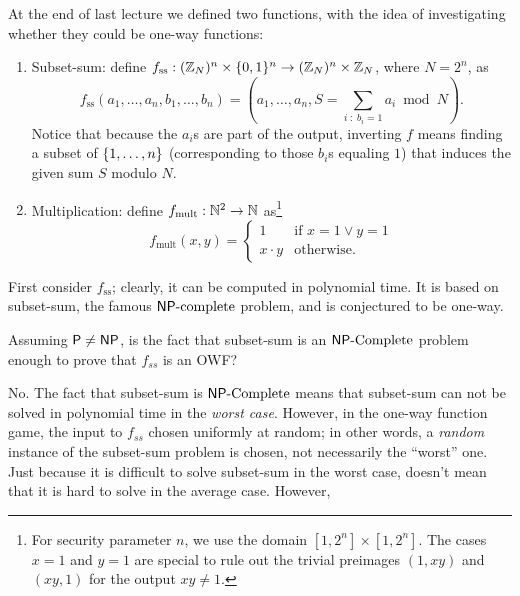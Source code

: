 \documentclass[11pt]{article}
\begin{document}
At the end of last lecture we defined two functions, with the idea of
investigating whether they could be one-way functions:
\begin{enumerate}
\item Subset-sum: define $f_{\text{ss}} : (\mathbb{Z}_{N})^{n} \times \{0,1\}^{n}
  \to (\mathbb{Z}_{N})^{n} \times \mathbb{Z}_{N}$, where $N = 2^{n}$, as \[
  f_{\text{ss}}(a_{1}, \ldots, a_{n}, b_{1}, \ldots, b_{n}) = (a_{1},
  \ldots, a_{n}, S = \sum_{i\; :\; b_{i} = 1} a_{i} \bmod N). \]
  Notice that because the $a_{i}$s are part of the output, inverting
  $f$ means finding a subset of $\{1,\ldots,n\}$ (corresponding to
  those $b_{i}$s equaling $1$) that induces the given sum $S$ modulo
  $N$.
\item Multiplication: define $f_{\text{mult}} : \mathbb{N}^{2} \to \mathbb{N}$
  as\footnote{For security parameter $n$, we use the domain $[1,2^{n}]
    \times [1,2^{n}]$.  The cases $x=1$ and $y=1$ are special to rule
    out the trivial preimages $(1,xy)$ and $(xy, 1)$ for the output
    $xy \neq 1$.}
  \[
  f_{\text{mult}}(x,y) =
  \begin{cases}
    1 & \text{if } x=1 \vee y=1 \\
    x \cdot y & \text{otherwise.}
  \end{cases}
  \]
\end{enumerate}

First consider $f_{\text{ss}}$; clearly, it can be computed in polynomial time. It is
based on subset-sum, the famous $\mathsf{NP}\text{-complete}$ problem, and is conjectured to be
one-way.

\begin{question}
    Assuming \(\mathsf{P} \neq \mathsf{NP}\), is the fact that subset-sum is an \(\mathsf{NP}\text{-Complete}\)
    problem enough to prove that \(f_{ss}\) is an OWF? 
\end{question}
\begin{answer}
    No. The fact that subset-sum is \(\mathsf{NP}\text{-Complete}\) means that subset-sum can not
    be solved in polynomial time in the \emph{worst case}. However, in the one-way
    function game, the input to \(f_{ss}\) chosen uniformly at random; in other words, a
    \emph{random} instance of the subset-sum problem is chosen, not necessarily the
    ``worst'' one. Just because it is difficult to solve subset-sum in the worst case,
    doesn't mean that it is hard to solve in the average case. However, 
\end{answer}
\par\vspace{\baselineskip}
\end{document}
